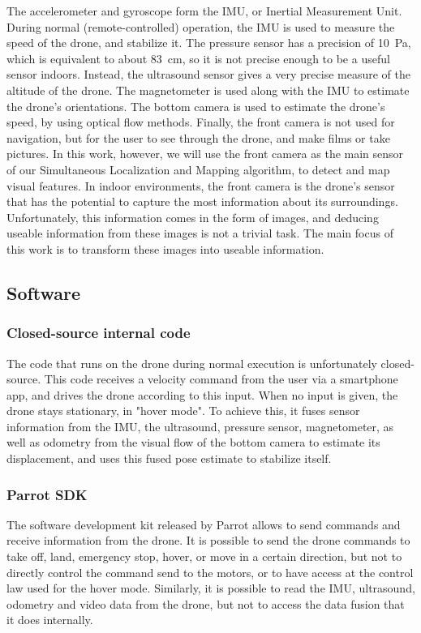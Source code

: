 The accelerometer and gyroscope form the IMU, or Inertial Measurement Unit. During normal (remote-controlled) operation, the IMU is used to measure the speed of the drone, and stabilize it. The pressure sensor has a precision of \SI{10}{\pascal}, which is equivalent to about \SI{83}{\centi\metre}, so it is not precise enough to be a useful sensor indoors. Instead, the ultrasound sensor gives a very precise measure of the altitude of the drone. The magnetometer is used along with the IMU to estimate the drone's orientations. The bottom camera is used to estimate the drone's speed, by using optical flow methods. Finally, the front camera is not used for navigation, but for the user to see through the drone, and make films or take pictures. In this work, however, we will use the front camera as the main sensor of our Simultaneous Localization and Mapping algorithm, to detect and map visual features. In indoor environments, the front camera is the drone's sensor that has the potential to capture the most information about its surroundings. Unfortunately, this information comes in the form of images, and deducing useable information from these images is not a trivial task. The main focus of this work is to transform these images into useable information.


\subsection{Software}

\subsubsection{Closed-source internal code}
The code that runs on the drone during normal execution is unfortunately closed-source. This code receives a velocity command from the user via a smartphone app, and drives the drone according to this input. When no input is given, the drone stays stationary, in "hover mode". To achieve this, it fuses sensor information from the IMU, the ultrasound, pressure sensor, magnetometer, as well as odometry from the visual flow of the bottom camera to estimate its displacement, and uses this fused pose estimate to stabilize itself.

\subsubsection{Parrot SDK}
The software development kit released by Parrot allows to send commands and receive information from the drone. It is possible to send the drone commands to take off, land, emergency stop, hover, or move in a certain direction, but not to directly control the command send to the motors, or to have access at the control law used for the hover mode. Similarly, it is possible to read the IMU, ultrasound, odometry and video data from the drone, but not to access the data fusion that it does internally.

